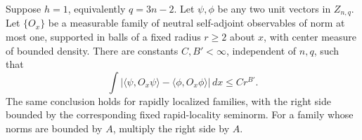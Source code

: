 \begin{corollary}
\label{cor:flags-one-hole}
Suppose $h=1$, equivalently $q=3n-2$.  Let $\psi,\phi$ be any two unit
vectors in $Z_{n,q}$.  Let $\{O_x\}$ be a measurable family of neutral
self-adjoint observables of norm at most one, supported in balls of a
fixed radius $r\geq2$ about $x$, with center measure of bounded density.
There are constants $C,B'<\infty$, independent of $n,q$, such that
\begin{equation}
 \int\left|
 \langle\psi,O_x\psi\rangle-\langle\phi,O_x\phi\rangle
 \right|\,dx\leq Cr^{B'}.
 \label{eq:flags-one-hole}
\end{equation}
The same conclusion holds for rapidly localized families, with the
right side bounded by the corresponding fixed rapid-locality seminorm.
For a family whose norms are bounded by $A$, multiply the right side by
$A$.
\end{corollary}

